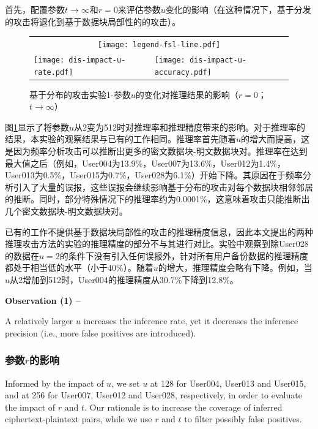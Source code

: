 首先，配置参数$t \rightarrow \infty$和$r = 0$来评估参数$u$变化的影响（在这种情况下，基于分发的攻击将退化到基于数据块局部性的的攻击\cite{li2017information}）。

\begin{figure}[!htbp]
    \centering
    \begin{tabular}{p{.48\linewidth}p{.48\linewidth}}
        \multicolumn{2}{c}{\texttt{[image: legend-fsl-line.pdf]}}  \\
        \texttt{[image: dis-impact-u-rate.pdf]} &
        \texttt{[image: dis-impact-u-accuracy.pdf]}\\
    \end{tabular}
    \caption{基于分布的攻击实验1-参数$u$的变化对推理结果的影响（$r = 0$；$t \rightarrow \infty$）}
    \label{fig:distribution-impact-u}
\end{figure}

图\ref{fig:distribution-impact-u}显示了将参数$u$从2变为512时对推理率和推理精度带来的影响。对于推理率的结果，本实验的观察结果与已有的工作\cite{li2017information}相同。推理率首先随着$u$的增大而提高，这是因为频率分析攻击可以推断出更多的密文数据块-明文数据块对。推理率在达到最大值之后（例如，User004为13.9\%，User007为13.6\%，User012为1.4\%，User013为0.5\%，User015为0.7\%，User028为6.1\%）开始下降。其原因在于频率分析引入了大量的误报，这些误报会继续影响基于分布的攻击对每个数据块相邻邻居的推断。同时，部分特殊情况下的推理率约为0.0001\%，这意味着攻击只能推断出几个密文数据块-明文数据块对。

已有的工作\cite{li2017information}不提供基于数据块局部性的攻击的推理精度信息，因此本文提出的两种推理攻击方法的实验的推理精度的部分不与其进行对比。实验中观察到除User028的数据在$u=2$的条件下没有引入任何误报外，针对所有用户备份数据的推理精度都处于相当低的水平（小于40\%）。随着$u$的增大，推理精度会略有下降。例如，当$u$从2增加到512时，User004的推理精度从30.7\%下降到12.8\%。
    
{\bf Observation (1) --} 

A relatively larger $u$ increases the inference rate, yet it decreases the inference precision (i.e., more false positives are introduced). 


\subsubsection{参数$r$的影响}

Informed by the impact of $u$, we set $u$ at 128 for User004, User013 and User015, and at 256 for User007, User012 and User028, respectively, in order to evaluate the impact of $r$ and $t$.  Our rationale is to increase the coverage of inferred ciphertext-plaintext pairs, while we use $r$ and $t$ to filter possibly false positives. 

